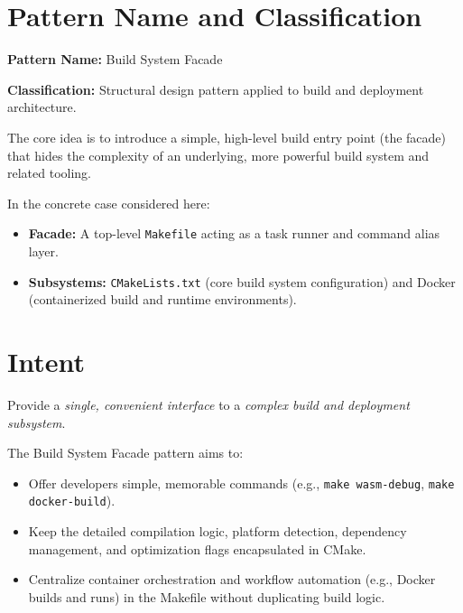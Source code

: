 \documentclass[11pt]{article}
\author{} %
\begin{document}
\maketitle

\section{Pattern Name and Classification}

\textbf{Pattern Name:} Build System Facade

\medskip

\textbf{Classification:} Structural design pattern applied to build and deployment architecture.

\medskip

The core idea is to introduce a simple, high-level build entry point (the facade) that hides the complexity of an underlying, more powerful build system and related tooling.

In the concrete case considered here:
\begin{itemize}[noitemsep]
  \item \textbf{Facade:} A top-level \texttt{Makefile} acting as a task runner and command alias layer.
  \item \textbf{Subsystems:} \texttt{CMakeLists.txt} (core build system configuration) and Docker (containerized build and runtime environments).
\end{itemize}

\section{Intent}

Provide a \emph{single, convenient interface} to a \emph{complex build and deployment subsystem}.

\medskip

The Build System Facade pattern aims to:
\begin{itemize}[noitemsep]
  \item Offer developers simple, memorable commands (e.g., \texttt{make wasm-debug}, \texttt{make docker-build}).
  \item Keep the detailed compilation logic, platform detection, dependency management, and optimization flags encapsulated in CMake.
  \item Centralize container orchestration and workflow automation (e.g., Docker builds and runs) in the Makefile without duplicating build logic.
\end{itemize}
\end{document}
